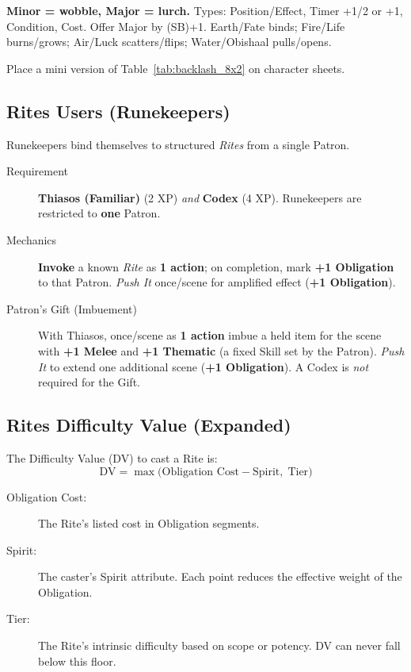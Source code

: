 \begin{tcolorbox}[title={Backlash Cheatsheet},colback=gray!5,colframe=black,breakable]
\textbf{Minor = wobble, Major = lurch.} Types: Position/Effect, Timer +1/2 or +1, Condition, Cost. Offer Major by (SB)+1. Earth/Fate binds; Fire/Life burns/grows; Air/Luck scatters/flips; Water/Obishaal pulls/opens.\par\smallskip
Place a mini version of Table~\ref{tab:backlash_8x2} on character sheets.
\end{tcolorbox}

\subsection{Rites Users (Runekeepers)}\label{subsec:runekeepers}

Runekeepers bind themselves to structured \emph{Rites} from a single Patron.

\begin{description}
    \item[Requirement] \textbf{Thiasos (Familiar)} (2 XP) \emph{and} \textbf{Codex} (4 XP). Runekeepers are restricted to \textbf{one} Patron.
    \item[Mechanics] \textbf{Invoke} a known \emph{Rite} as \textbf{1 action}; on completion, mark \textbf{+1 Obligation} to that Patron. \emph{Push It} once/scene for amplified effect (\textbf{+1 Obligation}).
    \item[Patron's Gift (Imbuement)] With Thiasos, once/scene as \textbf{1 action} imbue a held item for the scene with \textbf{+1 Melee} and \textbf{+1 Thematic} (a fixed Skill set by the Patron). \emph{Push It} to extend one additional scene (\textbf{+1 Obligation}). A Codex is \emph{not} required for the Gift.
\end{description}

\subsection{Rites Difficulty Value (Expanded)}\label{sec:rites_dv_expanded}

The Difficulty Value (DV) to cast a Rite is:
\[
\text{DV} = \max\!\bigl(\text{Obligation Cost} - \text{Spirit},\; \text{Tier}\bigr)
\]

\begin{description}
    \item[Obligation Cost:] The Rite's listed cost in Obligation segments.
    \item[Spirit:] The caster's Spirit attribute. Each point reduces the effective weight of the Obligation.
    \item[Tier:] The Rite's intrinsic difficulty based on scope or potency. DV can never fall below this floor.
\end{description}

